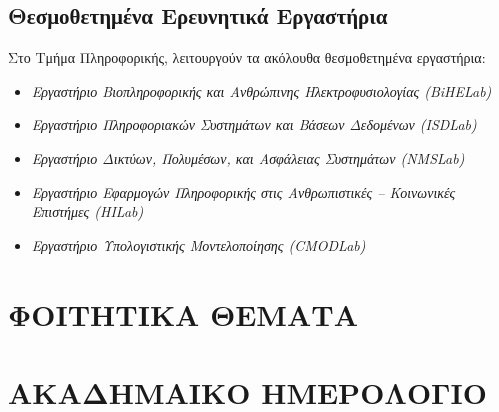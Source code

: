 \hypertarget{ux3b8ux3b5ux3c3ux3bcux3bfux3b8ux3b5ux3c4ux3b7ux3bcux3adux3bdux3b1-ux3b5ux3c1ux3b5ux3c5ux3bdux3b7ux3c4ux3b9ux3baux3ac-ux3b5ux3c1ux3b3ux3b1ux3c3ux3c4ux3aeux3c1ux3b9ux3b1}{%
\subsection{Θεσμοθετημένα Ερευνητικά
Εργαστήρια}\label{ux3b8ux3b5ux3c3ux3bcux3bfux3b8ux3b5ux3c4ux3b7ux3bcux3adux3bdux3b1-ux3b5ux3c1ux3b5ux3c5ux3bdux3b7ux3c4ux3b9ux3baux3ac-ux3b5ux3c1ux3b3ux3b1ux3c3ux3c4ux3aeux3c1ux3b9ux3b1}}

Στο Τμήμα Πληροφορικής, λειτουργούν τα ακόλουθα θεσμοθετημένα
εργαστήρια:

\begin{itemize}
\tightlist
\item
  \emph{Εργαστήριο Βιοπληροφορικής και Ανθρώπινης Ηλεκτροφυσιολογίας
  (BiHELab)}
\item
  \emph{Εργαστήριο Πληροφοριακών Συστημάτων και Βάσεων Δεδομένων
  (ISDLab)}
\item
  \emph{Εργαστήριο Δικτύων, Πολυμέσων, και Ασφάλειας Συστημάτων
  (NMSLab)}
\item
  \emph{Εργαστήριο Εφαρμογών Πληροφορικής στις Ανθρωπιστικές --
  Κοινωνικές Επιστήμες (HILab)}
\item
  \emph{Εργαστήριο Υπολογιστικής Μοντελοποίησης (CMODLab)}
\end{itemize}

\hypertarget{ux3c6ux3bfux3b9ux3c4ux3b7ux3c4ux3b9ux3baux3b1-ux3b8ux3b5ux3bcux3b1ux3c4ux3b1}{%
\section{ΦΟΙΤΗΤΙΚΑ
ΘΕΜΑΤΑ}\label{ux3c6ux3bfux3b9ux3c4ux3b7ux3c4ux3b9ux3baux3b1-ux3b8ux3b5ux3bcux3b1ux3c4ux3b1}}

\hypertarget{ux3b1ux3baux3b1ux3b4ux3b7ux3bcux3b1ux3b9ux3baux3bf-ux3b7ux3bcux3b5ux3c1ux3bfux3bbux3bfux3b3ux3b9ux3bf}{%
\section{ΑΚΑΔΗΜΑΙΚΟ
ΗΜΕΡΟΛΟΓΙΟ}\label{ux3b1ux3baux3b1ux3b4ux3b7ux3bcux3b1ux3b9ux3baux3bf-ux3b7ux3bcux3b5ux3c1ux3bfux3bbux3bfux3b3ux3b9ux3bf}}
